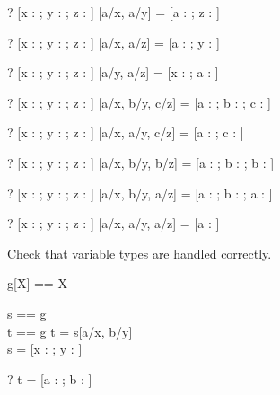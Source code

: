 \begin{zed}
  \vdash? [x : \nat; y : \nat; z : \power \nat] [a/x, a/y] = 
          [a : \nat; z : \power \nat] 
\end{zed}
\begin{zed}
  \vdash? [x : \nat; y : \nat; z : \nat] [a/x, a/z] = 
          [a : \nat; y : \nat] 
\end{zed}
\begin{zed}
  \vdash? [x : \nat; y : \power \nat; z : \power \nat] [a/y, a/z] = 
          [x : \nat; a : \power \nat] 
\end{zed}


\begin{zed}
  \vdash? [x : \nat; y : \nat; z : \power \nat] [a/x, b/y, c/z] = 
          [a : \nat; b : \nat; c : \power \nat] 
\end{zed}
\begin{zed}
  \vdash? [x : \nat; y : \nat; z : \power \nat] [a/x, a/y, c/z] = 
          [a : \nat; c : \power \nat] 
\end{zed}
\begin{zed}
  \vdash? [x : \nat; y : \nat; z : \nat] [a/x, b/y, b/z] = 
          [a : \nat; b : \nat; b : \nat] 
\end{zed}
\begin{zed}
  \vdash? [x : \nat; y : \nat; z : \nat] [a/x, b/y, a/z] = 
          [a : \nat; b : \nat; a : \nat] 
\end{zed}
\begin{zed}
  \vdash? [x : \nat; y : \nat; z : \nat] [a/x, a/y, a/z] = 
          [a : \nat] 
\end{zed}


Check that variable types are handled correctly.
\begin{zed}
  g[X] == X
\end{zed}

\begin{axdef}
  s == g\\
  t == g
\where
  t = s[a/x, b/y]\\
  s = [x : \nat; y : \power \nat]
\end{axdef}

\begin{zed} \vdash? t = [a : \nat; b : \power \nat] \end{zed}
